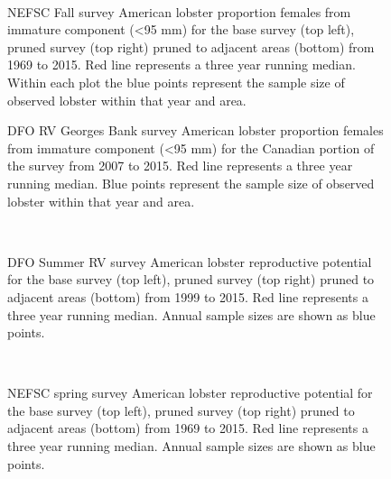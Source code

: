 \documentclass[11pt]{article}
\newcommand{\D}{.}
\newcommand{\e}{/backup/bio_data/bio.lobster/figures/} %
\begin{document}
\begin{figure}
\centering
{}\\
\caption{NEFSC Fall survey American lobster proportion females from immature component (\textless 95 mm) for the base survey (top left), pruned survey (top right) pruned to adjacent areas (bottom) from 1969 to 2015. Red line represents a three year running median. Within each plot the blue points represent the sample size of observed lobster within that year and area. }
\end{figure}
\clearpage


\begin{figure}

    \caption{DFO RV Georges Bank survey American lobster proportion females from immature component (\textless 95 mm) for the Canadian portion of the survey from 2007 to 2015. Red line represents a three year running median. Blue points represent the sample size of observed lobster within that year and area.}

\end{figure}


\begin{figure}
\centering
{}\\
\caption{DFO Summer RV survey American lobster reproductive potential for the base survey (top left), pruned survey (top right) pruned to adjacent areas (bottom) from 1999 to 2015. Red line represents a three year running median. Annual sample sizes are shown as blue points. }
\end{figure}
\clearpage


\begin{figure}
\centering
{}\\
\caption{NEFSC spring survey American lobster reproductive potential for the base survey (top left), pruned survey (top right) pruned to adjacent areas (bottom) from 1969 to 2015. Red line represents a three year running median. Annual sample sizes are shown as blue points. }
\end{figure}
\clearpage
\end{document}
